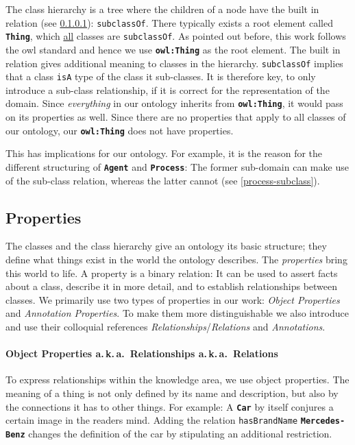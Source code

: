 \documentclass[a4paper, DIV=13, BCOR=0cm]{scrbook}
\newcommand{\aka}{a.\,k.\,a.\ }
\newcommand{\class}[1]{\texttt{\textbf{#1}}}
\newcommand{\relation}[1]{\texttt{#1}}
\begin{document}
The class hierarchy is a tree where the children of a node have the built in relation (see \ref{relations}): \relation{subclassOf}. There typically exists a root element called \class{Thing}, which \underline{all} classes are \relation{subclassOf}. As pointed out before, this work follows the \gls{owl} standard and hence we use \class{owl:Thing} as the root element. The built in relation gives additional meaning to classes in the hierarchy. \relation{subclassOf} implies that a class \relation{isA} type of the class it sub-classes. It is therefore key, to only introduce a sub-class relationship, if it is correct for the representation of the domain. Since \textit{everything} in our ontology inherits from \class{owl:Thing}, it would pass on its properties as well. Since there are no properties that apply to all classes of our ontology, our \class{owl:Thing} does not have properties.

This has implications for our ontology. For example, it is the reason for the different structuring of \class{Agent} and \class{Process}: The former sub-domain can make use of the sub-class relation, whereas the latter cannot (see \autoref{process-subclass}).

\subsection{Properties}
The classes and the class hierarchy give an ontology its basic structure; they define what things exist in the world the ontology describes. The \textit{properties} bring this world to life. A property is a binary relation: It can be used to assert facts about a class, describe it in more detail, and to establish relationships between classes. \cite{w3c-owl-guide} We primarily use two types of properties in our work: \textit{Object Properties} and \textit{Annotation Properties}. To make them more distinguishable we also introduce and use their colloquial references \textit{Relationships}/\textit{Relations} and \textit{Annotations}.

\paragraph{Object Properties \aka Relationships \aka Relations}
\label{relations}
To express relationships within the knowledge area, we use object properties. The meaning of a thing is not only defined by its name and description, but also by the connections it has to other things. For example: A \class{Car} by itself conjures a certain image in the readers mind. Adding the relation \relation{hasBrandName} \class{Mercedes-Benz} changes the definition of the car by stipulating an additional restriction.
\end{document}
